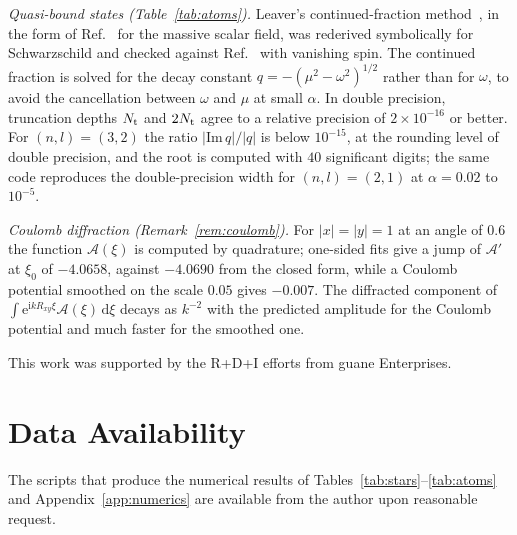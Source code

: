 \documentclass[%
 aip,
 jmp,
 amsmath,amssymb,
 reprint, onecolumn
]{revtex4-1}
\theoremstyle{definition}
\theoremstyle{remark}
\newcommand{\rmd}{\mathrm{d}}
\newcommand{\rmi}{\mathrm{i}}
\newcommand{\rme}{\mathrm{e}}
\begin{document}
\emph{Quasi-bound states (Table~\ref{tab:atoms}).} Leaver's
continued-fraction method~\cite{Leaver1985}, in the form of
Ref.~ for the massive scalar field, was rederived
symbolically for Schwarzschild and checked against
Ref.~ with vanishing spin. The
continued fraction is solved for the decay constant
$q=-(\mu^2-\omega^2)^{1/2}$ rather than for $\omega$, to avoid the
cancellation between $\omega$ and $\mu$ at small $\alpha$. In double
precision, truncation depths $N_{\rm t}$ and $2N_{\rm t}$ agree to a
relative precision of $2\times10^{-16}$ or better. For $(n,l)=(3,2)$ the
ratio $|\mathrm{Im}\,q|/|q|$ is below $10^{-15}$, at the rounding level
of double precision, and the root is computed with $40$ significant
digits; the same code reproduces the double-precision width for
$(n,l)=(2,1)$ at $\alpha=0.02$ to $10^{-5}$.

\emph{Coulomb diffraction (Remark~\ref{rem:coulomb}).} For $|x|=|y|=1$
at an angle of $0.6$ the function $\mathcal{A}(\xi)$ is computed by
quadrature; one-sided fits give a jump of $\mathcal{A}'$ at $\xi_0$ of
$-4.0658$, against
$-4.0690$ from the closed form, while a Coulomb potential smoothed on
the scale $0.05$ gives $-0.007$. The diffracted component of
$\int\rme^{\rmi kR_{xy}\xi}\mathcal{A}(\xi)\,\rmd\xi$ decays as $k^{-2}$
with the
predicted amplitude for the Coulomb potential and much faster for the
smoothed one.

\begin{acknowledgments}
This work was supported by the R+D+I efforts from guane Enterprises.
\end{acknowledgments}

\section*{Data Availability}

The scripts that produce the numerical results of
Tables~\ref{tab:stars}--\ref{tab:atoms} and Appendix~\ref{app:numerics}
are available from the author upon reasonable request.


\end{document}
